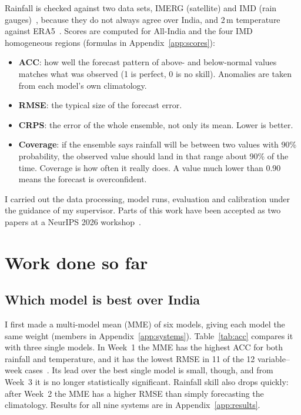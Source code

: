 \documentclass[11pt,a4paper]{article}
\begin{document}
Rainfall is checked against two data sets, IMERG (satellite) and IMD (rain gauges)~\cite{huffman2023imerg,pai2014imd}, because
they do not always agree over India, and 2\,m temperature against ERA5~\cite{hersbach2020era5}. Scores are computed for All-India
and the four IMD homogeneous regions (formulas in Appendix~\ref{app:scores}):
\begin{itemize}
\item \textbf{ACC}: how well the forecast pattern of above- and below-normal values matches what was observed (1 is perfect,
0 is no skill). Anomalies are taken from each model's own climatology.
\item \textbf{RMSE}: the typical size of the forecast error.
\item \textbf{CRPS}: the error of the whole ensemble, not only its mean. Lower is better.
\item \textbf{Coverage}: if the ensemble says rainfall will be between two values with 90\% probability, the observed value should
land in that range about 90\% of the time. Coverage is how often it really does. A value much lower than 0.90 means the forecast
is overconfident.
\end{itemize}

I carried out the data processing, model runs, evaluation and calibration under the guidance of my supervisor. Parts of
this work have been accepted as two papers at a NeurIPS 2026 workshop~\cite{raj2026bench,raj2026adapter}.

\section{Work done so far}

\subsection{Which model is best over India}
I first made a multi-model mean (MME) of six models, giving each model the same weight (members in
Appendix~\ref{app:systems}). Table~\ref{tab:acc}
compares it with three single models. In Week~1 the MME has the highest ACC for both rainfall and temperature, and it has the
lowest RMSE in 11 of the 12 variable--week cases~\cite{raj2026bench}. Its lead over the best single model is small, though, and from Week~3 it is no
longer statistically significant. Rainfall skill also drops quickly: after Week~2 the MME has a higher RMSE than simply forecasting the climatology.
Results for all nine systems are in Appendix~\ref{app:results}.
\end{document}
